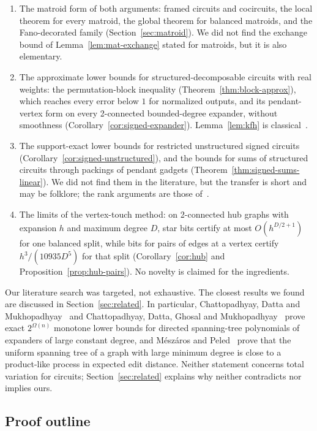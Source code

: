 \begin{enumerate}[label=(\roman*)]
\item The matroid form of both arguments: framed circuits and cocircuits, the local theorem for every matroid, the global theorem for balanced matroids, and the Fano-decorated family (Section~\ref{sec:matroid}). We did not find the exchange bound of Lemma~\ref{lem:mat-exchange} stated for matroids, but it is also elementary.
\item The approximate lower bounds for structured-decomposable circuits with real weights: the permutation-block inequality (Theorem~\ref{thm:block-approx}), which reaches every error below $1$ for normalized outputs, and its pendant-vertex form on every 2-connected bounded-degree expander, without smoothness (Corollary~\ref{cor:signed-expander}). Lemma~\ref{lem:kfh} is classical~\cite{FanHoffman53}.
\item The support-exact lower bounds for restricted unstructured signed circuits (Corollary~\ref{cor:signed-unstructured}), and the bounds for sums of structured circuits through packings of pendant gadgets (Theorem~\ref{thm:signed-sums-linear}). We did not find them in the literature, but the transfer is short and may be folklore; the rank arguments are those of~\cite{Raz09,RazYehudayoff09}.
\item The limits of the vertex-touch method: on 2-connected hub graphs with expansion $h$ and maximum degree $D$, star bits certify at most $O(h^{D/2+1})$ for one balanced split, while bits for pairs of edges at a vertex certify $h^3/(10935D^5)$ for that split (Corollary~\ref{cor:hub} and Proposition~\ref{prop:hub-pairs}). No novelty is claimed for the ingredients.
\end{enumerate}
Our literature search was targeted, not exhaustive. The closest results we found are discussed in Section~\ref{sec:related}. In particular, Chattopadhyay, Datta and Mukhopadhyay~\cite{CDM20Negations} and Chattopadhyay, Datta, Ghosal and Mukhopadhyay~\cite{CDGM22} prove exact $2^{\Omega(n)}$ monotone lower bounds for directed spanning-tree polynomials of expanders of large constant degree, and M\'esz\'aros and Peled~\cite{MeszarosPeled26} prove that the uniform spanning tree of a graph with large minimum degree is close to a product-like process in expected edit distance. Neither statement concerns total variation for circuits; Section~\ref{sec:related} explains why neither contradicts nor implies ours.

\subsection{Proof outline}\label{sec:outline}

